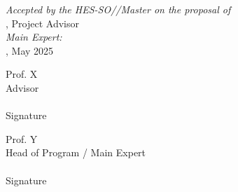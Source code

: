 
\vspace*{\fill} %

\begin{center}
    \textit{Accepted by the HES-SO//Master on the proposal of}\\[1cm]
    \Advisor, Project Advisor\\[0.5cm] %
    \textit{Main Expert: \Expert}\\[1.5cm] %

    \Place, May 2025 \\[2cm] %
\end{center}

\vspace{2cm}

\noindent %
\begin{minipage}{0.45\textwidth}
    \centering
    Prof. X\\ %
    Advisor \\
    \vspace{2cm} %
    \hrulefill \\
    Signature
\end{minipage}
\hfill
\begin{minipage}{0.45\textwidth}
    \centering
    Prof. Y\\ %
    Head of Program / Main Expert \\ %
    \vspace{2cm} %
    \hrulefill \\
    Signature
\end{minipage}

\vspace*{\fill}

